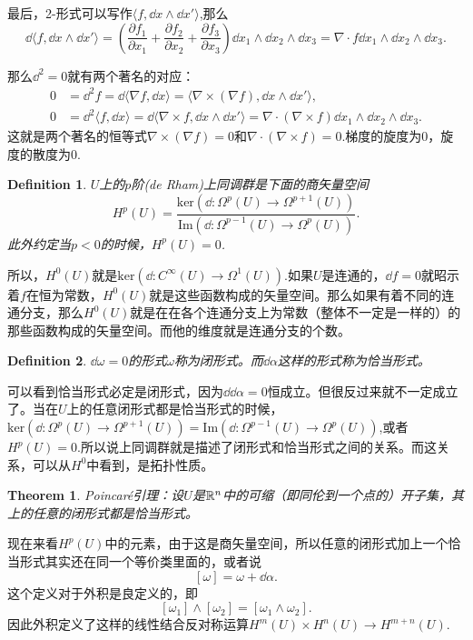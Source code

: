 \documentclass[8pt]{book}
\theoremstyle{plain}%
\newtheorem{theo}{Theorem}[section]%
\newtheorem{defi}{Definition}[section]%
\begin{document}
最后，2-形式可以写作$\langle f, \dd x \wedge \dd x'  \rangle$,那么
\[
\dd \langle f, \dd x \wedge \dd x'  \rangle=\left(\frac{\partial f_1}{\partial x_1}+\frac{\partial f_2}{\partial x_2}+\frac{\partial f_3}{\partial x_3}\right)\dd x_1 \wedge \dd x_2\wedge \dd x_3=\nabla\cdot f \dd x_1 \wedge \dd x_2\wedge \dd x_3.
\]

那么$\dd^2=0$就有两个著名的对应：
\[
\begin{split}
0&=\dd^2 f =\dd \langle \nabla f, \dd x \rangle = \langle \nabla\times (\nabla f),\dd x \wedge \dd x'  \rangle,\\
0&=\dd^2 \langle f, \dd x \rangle=\dd \langle \nabla\times  f,\dd x \wedge \dd x'  \rangle = \nabla\cdot( \nabla\times  f )\dd x_1 \wedge \dd x_2\wedge \dd x_3.
\end{split}
\]
这就是两个著名的恒等式$\nabla\times (\nabla f)=0$和$\nabla\cdot( \nabla\times  f )=0$.梯度的旋度为0，旋度的散度为0.

\begin{defi}
$U$上的$p$阶(de Rham)上同调群是下面的商矢量空间
\[
H^p(U)=\frac{\mathrm{ker}\left(\dd:\Omega^p(U)\to\Omega^{p+1}(U)\right)}{\mathrm{Im}\left(\dd:\Omega^{p-1}(U)\to\Omega^{p}(U)\right)}.
\]
此外约定当$p<0$的时候，$H^p(U)=0$.
\end{defi}
所以，$H^0(U)$就是$\mathrm{ker}\left(\dd:C^\infty(U)\to\Omega^1(U)\right)$.如果$U$是连通的，$\dd f=0$就昭示着$f$在恒为常数，$H^0(U)$就是这些函数构成的矢量空间。那么如果有着不同的连通分支，那么$H^0(U)$就是在在各个连通分支上为常数（整体不一定是一样的）的那些函数构成的矢量空间。而他的维度就是连通分支的个数。

\begin{defi}
$\dd \omega=0$的形式$\omega$称为闭形式。而$\dd \alpha$这样的形式称为恰当形式。
\end{defi}
可以看到恰当形式必定是闭形式，因为$\dd \dd \alpha=0$恒成立。但很反过来就不一定成立了。当在$U$上的任意闭形式都是恰当形式的时候，$\mathrm{ker}\left(\dd:\Omega^p(U)\to\Omega^{p+1}(U)\right)=\mathrm{Im}\left(\dd:\Omega^{p-1}(U)\to\Omega^{p}(U)\right)$,或者$H^p(U)=0$.所以说上同调群就是描述了闭形式和恰当形式之间的关系。而这关系，可以从$H^0$中看到，是拓扑性质。
\begin{theo}
Poincaré引理：设$U$是$\mathbb{R}^n$中的可缩（即同伦到一个点的）开子集，其上的任意的闭形式都是恰当形式。
\end{theo}

现在来看$H^p(U)$中的元素，由于这是商矢量空间，所以任意的闭形式加上一个恰当形式其实还在同一个等价类里面的，或者说
\[
[\omega]=\omega+\dd\alpha.
\]
这个定义对于外积是良定义的，即
\[
[\omega_1]\wedge[\omega_2]=[\omega_1\wedge\omega_2].
\]
因此外积定义了这样的线性结合反对称运算$H^{m}(U)\times H^{n}(U)\to H^{m+n}(U)$.
\end{document}
